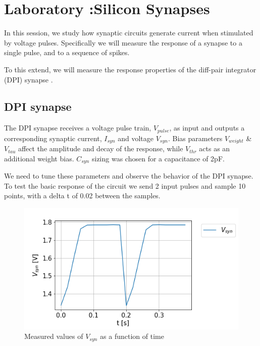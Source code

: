 \section{Laboratory :Silicon Synapses }

In this session, we study how synaptic circuits generate current when stimulated by voltage pulses. Specifically we will measure the response of a synapse to a single pulse, and to a sequence of spikes.

To this extend, we will measure the response properties of the diff-pair integrator (DPI) synapse . 

\subsection{DPI synapse}

The DPI synapse receives a voltage pulse train, $V_{pulse}$, as input and outputs a corresponding synaptic current, $I_{syn}$ and voltage $V_{syn}$. 
Bias parameters $V_{weight}$ & $V_{tau}$ affect the amplitude and decay of the response, while $V_{thr}$ acts as an additional weight bias. $C_{syn}$ sizing was chosen for a capacitance of 2pF. 


We need to tune these parameters and observe the behavior of the DPI synapse. 
To test the basic response of the circuit we send 2 input pulses and sample 10 points, with a delta t of 0.02 between the samples. 


\begin{figure}[H]
    \centering
    \includegraphics[width=0.95\linewidth]{Figures/synapse_lab.png}
    \caption{Measured values of $V_{syn}$ as a function of time}
    \label{fig:basalandcerebellum}
\end{figure}

